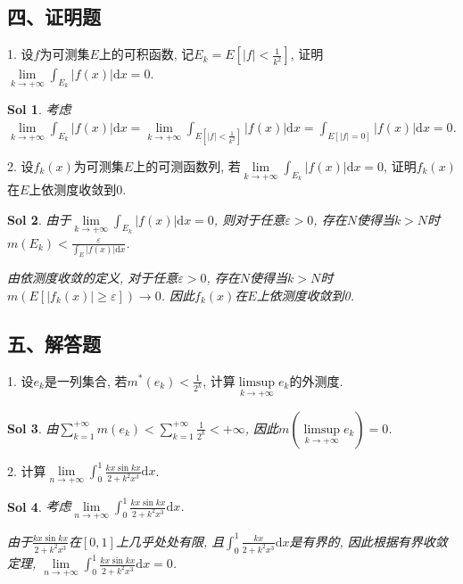\documentclass[UTF8]{article}
\newtheorem{solution}{Sol}
\begin{document}
  \subsection*{四、证明题}

  1. 设$f$为可测集$E$上的可积函数, 记$E_k=E\left[|f|<\frac{1}{k^2}\right]$, 证明$\lim \limits_{k \to +\infty}\int_{E_k}|f(x)|\mathrm{d}x=0$.\par

  \begin{solution}
    考虑$\lim \limits_{k \to +\infty}\int_{E_k}|f(x)|\mathrm{d}x=\lim \limits_{k \to +\infty}\int_{E\left[|f|<\frac{1}{k^2}\right]}|f(x)|\mathrm{d}x=\int_{E\left[|f|=0\right]}|f(x)|\mathrm{d}x=0$.\par
  \end{solution}

  2. 设$f_k(x)$为可测集$E$上的可测函数列, 若$\lim \limits_{k \to +\infty}\int_{E_k}|f(x)|\mathrm{d}x=0$, 证明$f_k(x)$在$E$上依测度收敛到0.\par

  \begin{solution}
    由于$\lim \limits_{k \to +\infty}\int_{E_k}|f(x)|\mathrm{d}x=0$, 则对于任意$\varepsilon >0$, 存在$N$使得当$k>N$时$m(E_k)<\frac{\varepsilon}{\int_{E}|f(x)|\mathrm{d}x}$.\par
    由依测度收敛的定义, 对于任意$\varepsilon >0$, 存在$N$使得当$k>N$时$m(E\left[|f_k(x)|\geqslant \varepsilon\right])\to 0$. 因此$f_k(x)$在$E$上依测度收敛到0.\par
  \end{solution}

  \subsection*{五、解答题}

  1. 设$e_k$是一列集合, 若$m^{*}(e_k)<\frac{1}{2^k}$, 计算$\limsup \limits_{k \to +\infty}e_k$的外测度.\par

  \begin{solution}
    由$\sum_{k=1}^{+\infty}m(e_k)<\sum_{k=1}^{+\infty}\frac{1}{2^k}<+\infty$, 因此$m(\limsup \limits_{k \to +\infty}e_k)=0$.\par
  \end{solution}

  2. 计算$\lim \limits_{n \to +\infty}\int_{0}^{1}\frac{kx \sin{kx}}{2+k^2x^3}\mathrm{d}x$.\par

  \begin{solution}
    考虑$\lim \limits_{n \to +\infty}\int_{0}^{1}\frac{kx \sin{kx}}{2+k^2x^3}\mathrm{d}x$.\par
    由于$\frac{kx \sin{kx}}{2+k^2x^3}$在$[0,1]$上几乎处处有限, 且$\int_{0}^{1}\frac{kx}{2+k^2x^3}\mathrm{d}x$是有界的, 因此根据有界收敛定理, $\lim \limits_{n \to +\infty}\int_{0}^{1}\frac{kx \sin{kx}}{2+k^2x^3}\mathrm{d}x=0$.\par
  \end{solution}
\end{document}
